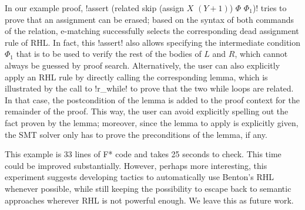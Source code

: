 \documentclass[sigplan,screen]{acmart}\settopmatter{}
\begin{document}
In our example proof, 
\ls!assert (related skip (assign $X$ $(Y + 1)$) $\Phi$ $\Phi_1$)!
tries to prove that an assignment can be erased; based on the syntax
of both commands of the relation, e-matching successfully selects the
corresponding dead assignment rule of RHL. In fact, this \ls!assert!
also allows specifying the intermediate condition $\Phi_1$ that is to
be used to verify the rest of the bodies of $L$ and $R$, which cannot
always be guessed by proof search. Alternatively, the user can also
explicitly apply an RHL rule by directly calling the corresponding
lemma, which is illustrated by the call to \ls!r_while! to prove that
the two while loops are related. In that case, the postcondition of
the lemma is added to the proof context for the remainder of the
proof. This way, the user can avoid explicitly spelling out the fact
proven by the lemma; moreover, since the lemma to apply is explicitly
given, the SMT solver only has to prove the preconditions of
the lemma, if any.

This example is 33 lines of F* code and takes 25 seconds to
check. This time could be improved substantially. However, perhaps
more interesting, this experiment suggests developing tactics to
automatically use Benton's RHL whenever possible, while still keeping
the possibility to escape back to semantic approaches wherever RHL is
not powerful enough. We leave this as future work.
\fi



\end{document}
